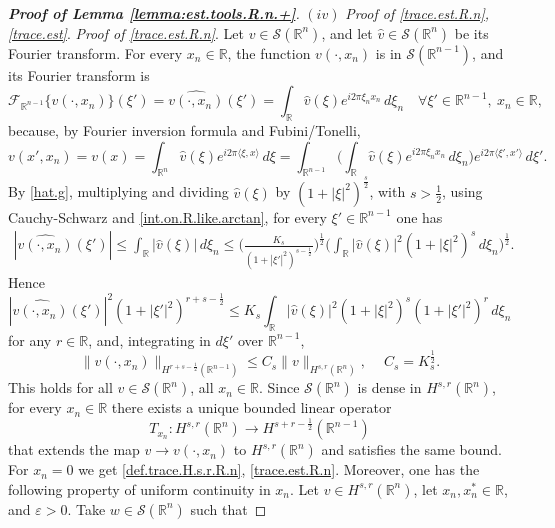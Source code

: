 \documentclass[10pt,reqno,a4paper]{article}
\numberwithin{equation}{section}
\theoremstyle{plain}
\theoremstyle{definition}
\newcommand{\R}{{\mathbb R}}
\newcommand{\mF}{\mathcal{F}}
\newcommand{\mS}{\mathcal{S}}
\newcommand{\e}{\varepsilon}
\newcommand{\la}{\langle}
\newcommand{\ra}{\rangle}
\begin{document}
\begin{proof}[\textbf{Proof of Lemma \ref{lemma:est.tools.R.n.+}}]
\medskip

$(iv)$ \emph{Proof of \eqref{trace.est.R.n},\eqref{trace.est}}. 
\emph{Proof of \eqref{trace.est.R.n}}.
Let $v \in \mS(\R^n)$, 
and let $\hat v \in \mS(\R^n)$ be its Fourier transform. 
For every $x_n \in \R$, the function $v(\cdot, x_n)$ is in $\mS(\R^{n-1})$, 
and its Fourier transform is 
\begin{equation} \label{hat.g}
\mF_{\R^{n-1}} \{ v(\cdot, x_n) \}(\xi') 
= \widehat{v(\cdot, x_n)} (\xi') 
= \int_\R \hat v(\xi) e^{i 2\pi \xi_n x_n} \, d\xi_n 
\quad \forall \xi' \in \R^{n-1}, \ x_n \in \R,
\end{equation}
because, by Fourier inversion formula and Fubini/Tonelli, 
\[
v(x',x_n)
= v(x) 
= \int_{\R^n} \hat v(\xi) e^{i 2\pi \la \xi , x \ra} \, d\xi 
= \int_{\R^{n-1}} \Big( \int_\R \hat v(\xi) e^{i 2\pi \xi_n x_n} \, d\xi_n \Big) 
e^{i 2\pi \la \xi' , x' \ra} \, d \xi'.
\]
By \eqref{hat.g}, 
multiplying and dividing $\hat v(\xi)$ by $(1 + |\xi|^2)^{\frac{s}{2}}$, 
with $s > \frac12$, 
using Cauchy-Schwarz and \eqref{int.on.R.like.arctan},  
for every $\xi' \in \R^{n-1}$ one has 
\begin{align}
|\widehat{v(\cdot,x_n)}(\xi')|
\leq \int_{\R} |\hat v(\xi)| \, d\xi_n 
\leq \Big( \frac{ K_s }{ (1 + |\xi'|^2)^{s-\frac12}} \Big)^{\frac12}  
\Big( \int_\R |\hat v(\xi)|^2 (1 + |\xi|^2)^s \, d\xi_n \Big)^{\frac12}.
\label{trace.Fou.01}
\end{align}
Hence
\begin{equation} \label{trace.Fou.02}
|\widehat{v(\cdot,x_n)}(\xi')|^2 (1 + |\xi'|^2)^{r+s-\frac12} 
\leq K_s \int_\R |\hat v(\xi)|^2 (1 + |\xi|^2)^s (1 + |\xi'|^2)^r \, d\xi_n
\end{equation}
for any $r \in \R$, and, integrating in $d \xi'$ over $\R^{n-1}$, 
\[
\| v(\cdot,x_n) \|_{H^{r+s-\frac12}(\R^{n-1})} 
\leq C_s \| v \|_{H^{s,r}(\R^n)}, \quad \ 
C_s = K_s^{\frac12}.
\]
This holds for all $v \in \mS(\R^n)$, all $x_n \in \R$.  
Since $\mS(\R^n)$ is dense in $H^{s,r}(\R^n)$, 
for every $x_n \in \R$ 
there exists a unique bounded linear operator 
\begin{equation} \label{T.x.n}
T_{x_n} : H^{s,r}(\R^n) \to H^{s+r-\frac12}(\R^{n-1})
\end{equation}
that extends the map $v \to v(\cdot, x_n)$ to $H^{s,r}(\R^n)$
and satisfies the same bound.
For $x_n=0$ we get \eqref{def.trace.H.s.r.R.n}, \eqref{trace.est.R.n}. 
Moreover, one has the following property of uniform continuity in $x_n$.
Let $v \in H^{s,r}(\R^n)$, let $x_n, x_n^* \in \R$, and $\e > 0$. 
Take $w \in \mS(\R^n)$ such that 

\end{proof}
\end{document}
